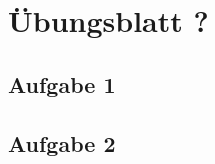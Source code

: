 \documentclass[12pt,a4paper,headsepline]{scrreprt}
\begin{document}


\section*{Übungsblatt ?}

\subsection*{Aufgabe 1}

\subsection*{Aufgabe 2}
\end{document}

